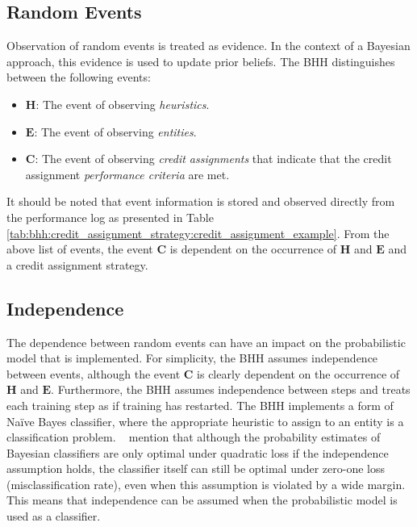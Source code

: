 \subsection{Random Events}
\label{sec:bhh:selection_mechanism:random_events}

Observation of random events is treated as evidence. In the context of a Bayesian approach, this evidence is used to update prior beliefs. The \acs{BHH} distinguishes between the following events:

\begin{itemize}
      \item \textbf{$\boldsymbol{H}$}: The event of observing \textit{heuristics}.
      \item \textbf{$\boldsymbol{E}$}: The event of observing \textit{entities}.
      \item \textbf{$\boldsymbol{C}$}: The event of observing \textit{credit assignments} that indicate that the credit assignment \textit{performance criteria} are met.
\end{itemize}

It should be noted that event information is stored and observed directly from the performance log as presented in Table \ref{tab:bhh:credit_assignment_strategy:credit_assignment_example}. From the above list of events, the event $\boldsymbol{C}$ is dependent on the occurrence of $\boldsymbol{H}$ and $\boldsymbol{E}$ and a credit assignment strategy.

\subsection{Independence}\label{sec:bhh:selection_mechanism:independence}

The dependence between random events can have an impact on the probabilistic model that is implemented. For simplicity, the \acs{BHH} assumes independence between events, although the event $\boldsymbol{C}$ is clearly dependent on the occurrence of $\boldsymbol{H}$ and $\boldsymbol{E}$. Furthermore, the \acs{BHH} assumes independence between steps  and treats each training step as if training has restarted. The \acs{BHH} implements a form of Naïve Bayes classifier, where the appropriate heuristic to assign to an entity is a classification problem. \citeauthor{ref:domingos:1997}~\cite{ref:domingos:1997} mention that although the probability estimates of Bayesian classifiers are only optimal under quadratic loss if the independence assumption holds, the classifier itself can still be optimal under zero-one loss (misclassification rate), even when this assumption is violated by a wide margin. This means that independence can be assumed when the probabilistic model is used as a classifier.

